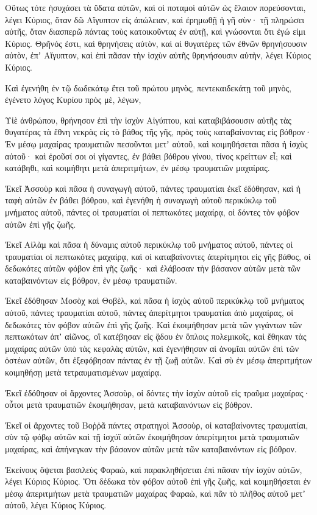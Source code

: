 {Οὕτως τότε ἡσυχάσει τὰ ὕδατα αὐτῶν, καὶ οἱ ποταμοὶ αὐτῶν ὡς ἔλαιον πορεύσονται, λέγει Κύριος,
ὅταν δῶ Αἴγυπτον εἰς ἀπώλειαν, καὶ ἐρημωθῇ ἡ γῆ σὺν· τῇ πληρώσει αὐτῆς, ὅταν διασπερῶ πάντας τοὺς κατοικοῦντας ἐν αὐτῇ, καὶ γνώσονται ὅτι ἐγώ εἰμι Κύριος.
Θρῆνός ἐστι, καὶ θρηνήσεις αὐτὸν, καὶ αἱ θυγατέρες τῶν ἐθνῶν θρηνήσουσιν αὐτὸν, ἐπʼ Αἴγυπτον, καὶ ἐπὶ πᾶσαν τὴν ἰσχὺν αὐτῆς θρηνήσουσιν αὐτὴν, λέγει Κύριος Κύριος.
\par }{\PP {}Καὶ ἐγενήθη ἐν τῷ δωδεκάτῳ ἔτει τοῦ πρώτου μηνὸς, πεντεκαιδεκάτῃ τοῦ μηνὸς, ἐγένετο λόγος Κυρίου πρὸς μὲ, λέγων,
\par }{\PP {}Υἱὲ ἀνθρώπου, θρήνησον ἐπὶ τὴν ἰσχὺν Αἰγύπτου, καὶ καταβιβάσουσιν αὐτῆς τὰς θυγατέρας τὰ ἔθνη νεκρὰς εἰς τὸ βάθος τῆς γῆς, πρὸς τοὺς καταβαίνοντας εἰς βόθρον·
Ἐν μέσῳ μαχαίρας τραυματιῶν πεσοῦνται μετʼ αὐτοῦ, καὶ κοιμηθήσεται πᾶσα ἡ ἰσχὺς αὐτοῦ·
καὶ ἐροῦσί σοι οἱ γίγαντες, ἐν βάθει βόθρου γίνου, τίνος κρείττων εἶ; καὶ κατάβηθι, καὶ κοιμήθητι μετὰ ἀπεριτμήτων, ἐν μέσῳ τραυματιῶν μαχαίρας.
\par }{\PP {}Ἐκεῖ Ἀσσοὺρ καὶ πᾶσα ἡ συναγωγὴ αὐτοῦ, πάντες τραυματίαι ἐκεῖ ἐδόθησαν, καὶ ἡ ταφὴ αὐτῶν ἐν βάθει βόθρου, καὶ ἐγενήθη ἡ συναγωγὴ αὐτοῦ περικύκλῳ τοῦ μνήματος αὐτοῦ, πάντες οἱ τραυματίαι οἱ πεπτωκότες μαχαίρᾳ,
οἱ δόντες τὸν φόβον αὐτῶν ἐπὶ γῆς ζωῆς.
\par }{\PP {}Ἐκεῖ Αἰλὰμ καὶ πᾶσα ἡ δύναμις αὐτοῦ περικύκλῳ τοῦ μνήματος αὐτοῦ, πάντες οἱ τραυματίαι οἱ πεπτωκότες μαχαίρᾳ, καὶ οἱ καταβαίνοντες ἀπερίτμητοι εἰς γῆς βάθος, οἱ δεδωκότες αὐτῶν φόβον ἐπὶ γῆς ζωῆς· καὶ ἐλάβοσαν τὴν βάσανον αὐτῶν μετὰ τῶν καταβαινόντων εἰς βόθρον,
ἐν μέσῳ τραυματιῶν.
\par }{\PP {}Ἐκεῖ ἐδόθησαν Μοσὸχ καὶ Θοβὲλ, καὶ πᾶσα ἡ ἰσχὺς αὐτοῦ περικύκλῳ τοῦ μνήματος αὐτοῦ, πάντες τραυματίαι αὐτοῦ, πάντες ἀπερίτμητοι τραυματίαι ἀπὸ μαχαίρας, οἱ δεδωκότες τὸν φόβον αὐτῶν ἐπὶ γῆς ζωῆς.
Καὶ ἐκοιμήθησαν μετὰ τῶν γιγάντων τῶν πεπτωκότων ἀπʼ αἰῶνος, οἳ κατέβησαν εἰς ᾅδου ἐν ὅπλοις πολεμικοῖς, καὶ ἔθηκαν τὰς μαχαίρας αὐτῶν ὑπὸ τὰς κεφαλὰς αὐτῶν, καὶ ἐγενήθησαν αἱ ἀνομῖαι αὐτῶν ἐπὶ τῶν ὀστέων αὐτῶν, ὅτι ἐξεφόβησαν πάντας ἐν τῇ ζωῇ αὐτῶν.
Καὶ σὺ ἐν μέσῳ ἀπεριτμήτων κοιμηθήσῃ μετὰ τετραυματισμένων μαχαίρᾳ.
\par }{\PP {}Ἐκεῖ ἐδόθησαν οἱ ἄρχοντες Ἀσσοὺρ, οἱ δόντες τὴν ἰσχὺν αὐτοῦ εἰς τραῦμα μαχαίρας· οὗτοι μετὰ τραυματιῶν ἐκοιμήθησαν, μετὰ καταβαινόντων εἰς βόθρον.
\par }{\PP {}Ἐκεῖ οἱ ἄρχοντες τοῦ Βοῤῥᾶ πάντες στρατηγοὶ Ἀσσοὺρ, οἱ καταβαίνοντες τραυματίαι, σὺν τῷ φόβῳ αὐτῶν καὶ τῇ ἰσχύϊ αὐτῶν ἐκοιμήθησαν ἀπερίτμητοι μετὰ τραυματιῶν μαχαίρας, καὶ ἀπήνεγκαν τὴν βάσανον αὐτῶν μετὰ τῶν καταβαινόντων εἰς βόθρον.
\par }{\PP {}Ἐκείνους ὄψεται βασιλεὺς Φαραὼ, καὶ παρακληθήσεται ἐπὶ πᾶσαν τὴν ἰσχὺν αὐτῶν, λέγει Κύριος Κύριος.
Ὅτι δέδωκα τὸν φόβον αὐτοῦ ἐπὶ γῆς ζωῆς, καὶ κοιμηθήσεται ἐν μέσῳ ἀπεριτμήτων μετὰ τραυματιῶν μαχαίρας Φαραὼ, καὶ πᾶν τὸ πλῆθος αὐτοῦ μετʼ αὐτοῦ, λέγει Κύριος Κύριος.

}
